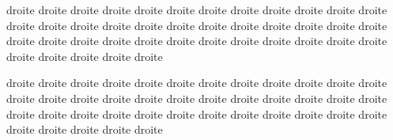 \documentclass[12pt]{book}
\begin{document}
\begin{pages}
\begin{Rightside}
\pstart
\begin{ledgroup}
droite droite droite droite droite droite droite droite droite droite droite droite droite droite droite droite droite droite droite droite droite droite droite droite droite droite droite droite droite droite droite droite droite droite droite droite droite droite droite droite droite

droite droite droite droite droite droite droite droite droite droite droite droite droite droite droite droite droite droite droite droite droite droite droite droite droite droite droite droite droite droite droite droite droite droite droite droite droite droite droite droite droite

\end{ledgroup}
\pend
\endnumbering
\end{Rightside}

\end{pages}
\Pages
\end{document}
